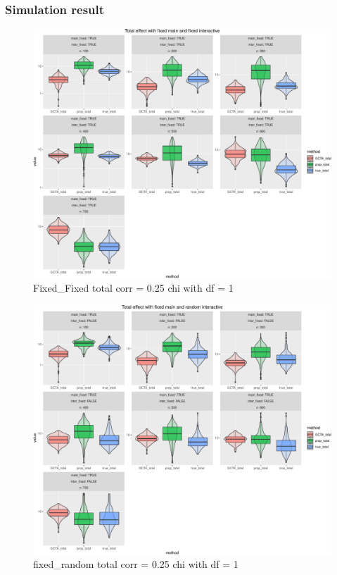 \documentclass[]{article}
\begin{document}
\subsubsection{Simulation result}\label{simulation-result}

\begin{figure}
\centering
\includegraphics{Decorrelation_method_and_their_effect_on_proposed_method_files/figure-latex/fixed_fixed_svd_sim_red-1.pdf}
\caption{Fixed\_Fixed total corr = 0.25 chi with df = 1}
\end{figure}

\begin{figure}
\centering
\includegraphics{Decorrelation_method_and_their_effect_on_proposed_method_files/figure-latex/fixed_random_sim_red-1.pdf}
\caption{fixed\_random total corr = 0.25 chi with df = 1}
\end{figure}
\end{document}
